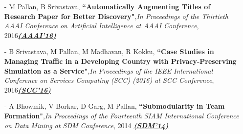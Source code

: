 \documentclass[margin,line]{res}
\begin{document}
\begin{resume}
\begin{itemize}
\item[-] M Pallan, B Srivastava, {\bf ``Automatically Augmenting Titles of Research Paper for Better Discovery"},{\em In Proceedings of the Thirtieth AAAI Conference on Artificial Intelligence at AAAI Conference}, 2016{\bf \href{https://www.aaai.org/ocs/index.php/WS/AAAIW16/paper/view/12578/12441}{\em (AAAI'16)}}

\item[-] B Srivastava, M Pallan, M Madhavan, R Kokku, {\bf ``Case Studies in Managing Traffic in a Developing Country with Privacy-Preserving Simulation as a Service"},{\em In Proceedings of the IEEE International Conference on Services Computing (SCC) (2016) at SCC Conference}, 2016{\bf \href{https://www.computer.org/csdl/proceedings/scc/2016/2628/00/2628a766-abs.html}{\em (SCC'16)}}

\item[-] A Bhowmik, V Borkar, D Garg, M Pallan, {\bf ``Submodularity in Team Formation"},{\em In Proceedings of the Fourteenth SIAM International Conference on Data Mining at SDM Conference}, 2014 {\bf \href{http://epubs.siam.org/doi/pdf/10.1137/1.9781611973440.102}{\em (SDM'14)}}

\end{itemize}


\end{resume}
\end{document}
